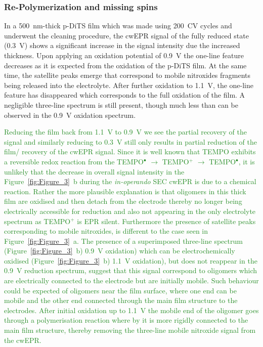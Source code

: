 \documentclass{WileyMSP-template}
\newcommand{\np}[1]{\textcolor{ForestGreen}{#1}}
\begin{document}
\bigbreak

\subsubsection*{Re-Polymerization and missing spins}

In a 500~nm-thick p-DiTS film which was made using 200~CV cycles and underwent the cleaning procedure, the cwEPR signal of the fully reduced state (0.3~V) shows a significant increase in the signal intensity due the increased thickness. Upon applying an oxidation potential of 0.9~V the one-line feature decreases as it is expected from the oxidation of the p-DiTS film. At the same time, the satellite peaks emerge that correspond to mobile nitroxides fragments being released into the electrolyte. After further oxidation to 1.1~V, the one-line feature has disappeared which corresponds to the full oxidation of the film. A negligible three-line spectrum is still present, though much less than can be observed in the 0.9~V oxidation spectrum.\\

\bigbreak

\np{
Reducing the film back from 1.1~V to 0.9~V we see the partial recovery of the signal and similarly reducing to 0.3~V still only results in partial reduction of the film/ recovery of the cwEPR signal. Since it is well known that TEMPO exhibits a reversible redox reaction from the TEMPO$^{\bullet}$ $\rightarrow$ TEMPO$^{+}$ $\rightarrow$ TEMPO$^{\bullet}$, it is unlikely that the decrease in overall signal intensity in the Figure~\ref{fig:Figure_3}~b during the \textit{in-operando} SEC cwEPR is due to a chemical reaction. Rather the more plausible explanation is that oligomers in this thick film are oxidised and then detach from the electrode thereby no longer being electrically accessible for reduction and also not appearing in the only electrolyte spectrum as TEMPO$^{+}$ is EPR silent. Furthermore the presence of satellite peaks corresponding to mobile nitroxides, is different to the case seen in Figure~\ref{fig:Figure_3}~a. The presence of a superimposed three-line spectrum (Figure~\ref{fig:Figure_3}~b) 0.9~V oxidation) which can be electrochemically oxidised (Figure~\ref{fig:Figure_3}~b) 1.1~V oxidation), but does not reappear in the 0.9~V reduction spectrum, suggest that this signal correspond to oligomers which are electrically connected to the electrode but are initially mobile. Such behaviour could be expected of oligomers near the film surface, where one end can be mobile and the other end connected through the main film structure to the electrodes. After initial oxidation up to 1.1~V the mobile end of the oligomer goes through a polymerisation reaction where by it is more rigidly connected to the main film structure, thereby removing the three-line mobile nitroxide signal from the cwEPR.
}
\end{document}
